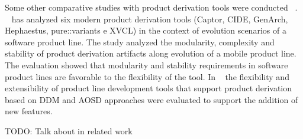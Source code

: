Some other comparative studies with product derivation tools were conducted ~\citep{DBLP:conf/gpce/TorresKSBTBCLBM10, uiraWBDDM:2010}. 
~\citep{DBLP:conf/gpce/TorresKSBTBCLBM10} has analyzed six modern product derivation tools (Captor, CIDE, GenArch, Hephaestus, pure::variants e XVCL) in the context of evolution scenarios of a software product line. The study analyzed the modularity, complexity and stability of product derivation artifacts along  evolution of a mobile product line. The evaluation showed that  modularity and  stability requirements in software product lines are favorable to the flexibility of the tool.
In ~\citep{uiraWBDDM:2010} the flexibility and extensibility of product line development tools that support product derivation based on DDM and AOSD approaches were evaluated to support the addition of new features.

TODO: Talk about \cite{deltaSchaefer} in related work
